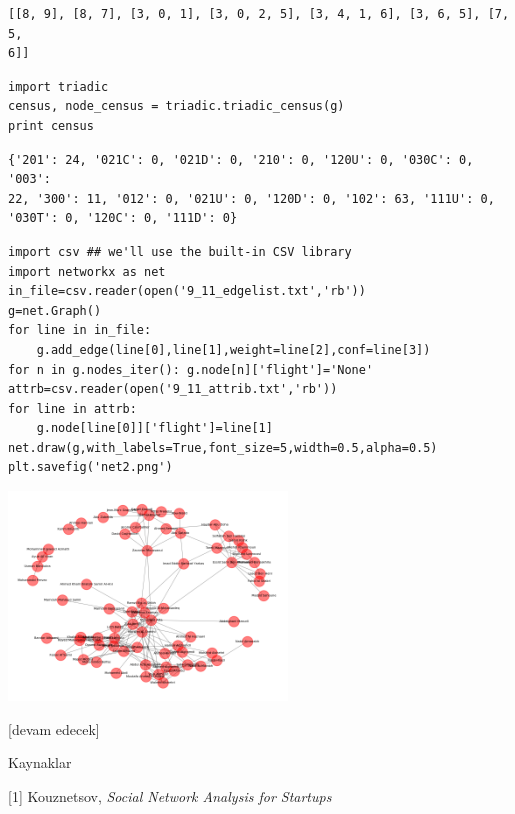 \documentclass[12pt,fleqn]{article}\usepackage{../../common}
\begin{document}
\begin{verbatim}
[[8, 9], [8, 7], [3, 0, 1], [3, 0, 2, 5], [3, 4, 1, 6], [3, 6, 5], [7, 5,
6]] 
\end{verbatim}


\begin{verbatim}
import triadic
census, node_census = triadic.triadic_census(g)
print census
\end{verbatim}

\begin{verbatim}
{'201': 24, '021C': 0, '021D': 0, '210': 0, '120U': 0, '030C': 0, '003':
22, '300': 11, '012': 0, '021U': 0, '120D': 0, '102': 63, '111U': 0,
'030T': 0, '120C': 0, '111D': 0} 
\end{verbatim}


\begin{verbatim}
import csv ## we'll use the built-in CSV library
import networkx as net
in_file=csv.reader(open('9_11_edgelist.txt','rb'))
g=net.Graph()
for line in in_file:
    g.add_edge(line[0],line[1],weight=line[2],conf=line[3])
for n in g.nodes_iter(): g.node[n]['flight']='None'
attrb=csv.reader(open('9_11_attrib.txt','rb'))
for line in attrb:
    g.node[line[0]]['flight']=line[1]
net.draw(g,with_labels=True,font_size=5,width=0.5,alpha=0.5)
plt.savefig('net2.png')
\end{verbatim}

\includegraphics[width=20em]{net2.png}






[devam edecek]

Kaynaklar

[1] Kouznetsov, {\em Social Network Analysis for Startups}
\end{document}

